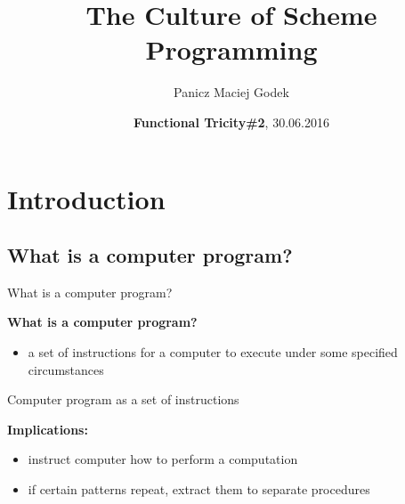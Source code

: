 \documentclass{beamer}
\title{\textbf{The Culture of Scheme Programming}}
\author{Panicz Maciej Godek}
\institute{
  \tiny{\href{mailto:godek.maciek@gmail.com}{\textbf{godek.maciek@gmail.com}}}
}
\date{\textbf{Functional Tricity\#2}, 30.06.2016}
\begin{document}
\begin{frame}
  \titlepage
\end{frame}

\section{Introduction}

\subsection{What is a computer program?}

\begin{frame}{What is a computer program?}

  \textbf{What is a computer program?}
  \pause
  \begin{itemize}
  \item
    a set of instructions for a computer to execute
    under some specified circumstances
  \end{itemize}
\end{frame}


\begin{frame}{Computer program as a set of instructions}

  \textbf{Implications:}
  \pause
  \begin{itemize}
  \item
    instruct computer how to perform a computation
    \pause
  \item
    if certain patterns repeat, extract them to separate procedures
      
  \end{itemize}
\end{frame}

{ %
  \begin{frame}[plain]
  \end{frame}
}
\end{document}
